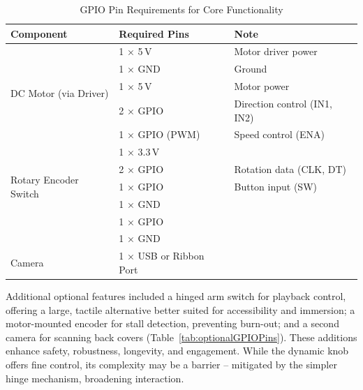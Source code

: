                 \begin{table}[htbp]
                    \centering
                    \caption{GPIO Pin Requirements for Core Functionality}
                    \label{tab:coreGPIOPins}
                    \begin{tabular}{|l|l|l|}
                        \hline
                        \textbf{Component} & \textbf{Required Pins} & \textbf{Note}\\ \hline
                        \multirow{5}{*}{DC Motor (via Driver)} & 1 × 5\,V & Motor driver power \\ \cline{2-3}
                                                               & 1 × GND & Ground \\ \cline{2-3}
                                                               & 1 × 5\,V & Motor power \\ \cline{2-3}
                                                               & 2 × GPIO & Direction control (IN1, IN2) \\ \cline{2-3}
                                                               & 1 × GPIO (PWM) & Speed control (ENA) \\ \hline
                        \multirow{5}{*}{Rotary Encoder Switch} & 1 × 3.3\,V & \\ \cline{2-3}
                                                               & 2 × GPIO& Rotation data (CLK, DT)\\ \cline{2-3}
                                                               & 1 × GPIO & Button input (SW)\\ \cline{2-3}
                                                               & 1 × GND & \\ \hline
                        \multirow{2}{*}{Button (Camera Trigger)} & 1 × GPIO & \\ \cline{2-3}
                                                                 & 1 × GND & \\ \hline
                        Camera & 1 × USB or Ribbon Port & \\ \hline
                    \end{tabular}
                \end{table}
    
                Additional optional features included a hinged arm switch for playback control, offering a large, tactile alternative better suited for accessibility and immersion; a motor-mounted encoder for stall detection, preventing burn-out; and a second camera for scanning back covers (Table~\ref{tab:optionalGPIOPins}). These additions enhance safety, robustness, longevity, and engagement. While the dynamic knob offers fine control, its complexity may be a barrier -- mitigated by the simpler hinge mechanism, broadening interaction.
    
